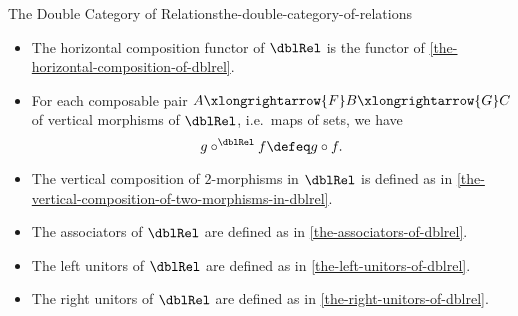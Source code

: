 \begin{definition}{The Double Category of Relations}{the-double-category-of-relations}
\begin{itemize}
\begin{webcompile}
            \end{webcompile}%
        \item{}The horizontal composition functor of $\dblRel$ is the functor of \cref{the-horizontal-composition-of-dblrel}.
        \item{}For each composable pair $A\smash{\xlongrightarrow{F}}B\smash{\xlongrightarrow{G}}C$ of vertical morphisms of $\dblRel$, i.e.\ maps of sets, we have
            \[
                g\mathbin{{\circ}^{\dblRel}}f
                \defeq
                g\circ f.
            \]%
        \item{}The vertical composition of $2$-morphisms in $\dblRel$ is defined as in \cref{the-vertical-composition-of-two-morphisms-in-dblrel}.
        \item{}The associators of $\dblRel$ are defined as in \cref{the-associators-of-dblrel}.
        \item{}The left unitors of $\dblRel$ are defined as in \cref{the-left-unitors-of-dblrel}.
        \item{}The right unitors of $\dblRel$ are defined as in \cref{the-right-unitors-of-dblrel}.
    \end{itemize}
\end{definition}
